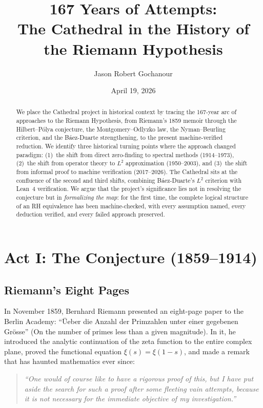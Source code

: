 \documentclass[11pt,a4paper]{article}
\title{%
  167 Years of Attempts:\\
  The Cathedral in the History of the Riemann Hypothesis%
}
\author{
  Jason Robert Gochanour
}
\date{April 19, 2026}
\begin{document}
\maketitle

\begin{abstract}
We place the Cathedral project in historical context by tracing
the 167-year arc of approaches to the Riemann Hypothesis, from
Riemann's 1859 memoir through the Hilbert--P\'olya conjecture,
the Montgomery--Odlyzko law, the Nyman--Beurling criterion, and
the B\'aez-Duarte strengthening, to the present machine-verified
reduction. We identify three historical turning points where the
approach changed paradigm: (1)~the shift from direct zero-finding
to spectral methods (1914--1973), (2)~the shift from operator
theory to $L^2$ approximation (1950--2003), and (3)~the shift
from informal proof to machine verification (2017--2026). The
Cathedral sits at the confluence of the second and third shifts,
combining B\'aez-Duarte's $L^2$ criterion with Lean~4
verification. We argue that the project's significance lies not
in resolving the conjecture but in \emph{formalizing the map}: for
the first time, the complete logical structure of an RH equivalence
has been machine-checked, with every assumption named, every
deduction verified, and every failed approach preserved.
\end{abstract}

\tableofcontents

\section{Act I: The Conjecture (1859--1914)}

\subsection{Riemann's Eight Pages}

In November 1859, Bernhard Riemann presented an eight-page paper
to the Berlin Academy: ``\"Ueber die Anzahl der Primzahlen unter
einer gegebenen Gr\"osse'' (On the number of primes less than a
given magnitude). In it, he introduced the analytic continuation
of the zeta function to the entire complex plane, proved the
functional equation $\xi(s) = \xi(1-s)$, and made a remark that
has haunted mathematics ever since:

\begin{quote}
\emph{``One would of course like to have a rigorous proof of this,
but I have put aside the search for such a proof after some
fleeting vain attempts, because it is not necessary for the
immediate objective of my investigation.''}
\end{quote}
\end{document}
